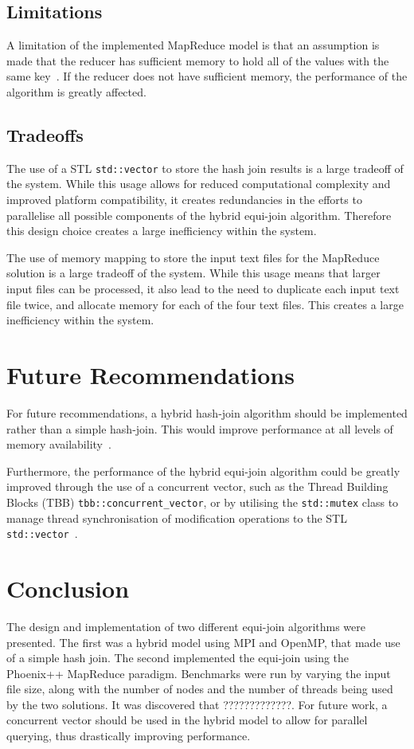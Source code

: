 \documentclass[10pt,twocolumn]{witseiepaper}
\begin{document}
\subsection{Limitations}
A limitation of the implemented MapReduce model is that an assumption is made that the reducer has sufficient memory to hold all of the values with the same key~\cite{mapReduceJoin}. If the reducer does not have sufficient memory, the performance of the algorithm is greatly affected.

\subsection{Tradeoffs} \label{sec:tradeoffs}
The use of a STL \texttt{std::vector} to store the hash join results is a large tradeoff of the system. While this usage allows for reduced computational complexity and improved platform compatibility, it creates redundancies in the efforts to parallelise all possible components of the hybrid equi-join algorithm. Therefore this design choice creates a large inefficiency within the system.

The use of memory mapping to store the input text files for the MapReduce solution is a large tradeoff of the system. While this usage means that larger input files can be processed, it also lead to the need to duplicate each input text file twice, and allocate memory for each of the four text files. This creates a large inefficiency within the system.

\section{Future Recommendations}
For future recommendations, a hybrid hash-join algorithm should be implemented rather than a simple hash-join. This would improve performance at all levels of memory availability~\cite{evaluating4JoinAlgorithms}.

Furthermore, the performance of the hybrid equi-join algorithm could be greatly improved through the use of a concurrent vector, such as the Thread Building Blocks (TBB) \texttt{tbb::concurrent\_vector}, or by utilising the \texttt{std::mutex} class to manage thread synchronisation of modification operations to the STL \texttt{std::vector}~\cite{tbb,mutex}.

\section{Conclusion}
The design and implementation of two different equi-join algorithms were presented. The first was a hybrid model using MPI and OpenMP, that made use of a simple hash join. The second implemented the equi-join using the Phoenix++ MapReduce paradigm. Benchmarks were run by varying the input file size, along with the number of nodes and the number of threads being used by the two solutions. It was discovered that ?????????????. For future work, a concurrent vector should be used in the hybrid model to allow for parallel querying, thus drastically improving performance.



\end{document}
